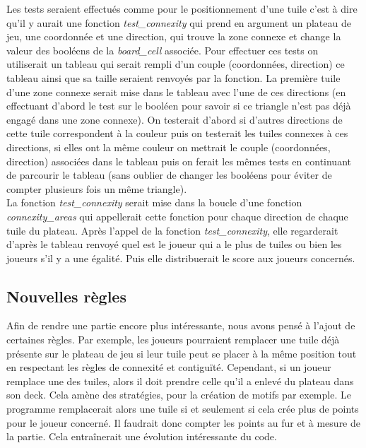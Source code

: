 \documentclass[11pt]{article}
\begin{document}
Les tests seraient effectués comme pour le positionnement d'une tuile c'est à dire qu'il y aurait une fonction \emph{test\_connexity} qui prend en argument un plateau de jeu, une coordonnée et une direction, qui trouve la zone connexe et change la valeur des booléens de la \emph{board\_cell} associée. Pour effectuer ces tests on utiliserait un tableau qui serait rempli d'un couple (coordonnées, direction) ce tableau ainsi que sa taille seraient renvoyés par la fonction. La première tuile d'une zone connexe serait mise dans le tableau avec l'une de ces directions (en effectuant d'abord le test sur le booléen pour savoir si ce triangle n'est pas déjà engagé dans une zone connexe). On testerait d'abord si d'autres directions de cette tuile correspondent à la couleur puis on testerait les tuiles connexes à ces directions, si elles ont la même couleur on mettrait le couple (coordonnées, direction) associées dans le tableau puis on ferait les mêmes tests en continuant de parcourir le tableau (sans oublier de changer les booléens pour éviter de compter plusieurs fois un même triangle). \\

La fonction \emph{test\_connexity} serait mise dans la boucle d'une fonction \emph{connexity\_areas} qui appellerait cette fonction pour chaque direction de chaque tuile du plateau. Après l'appel de la fonction \emph{test\_connexity}, elle regarderait d'après le tableau renvoyé quel est le joueur qui a le plus de tuiles ou bien les joueurs s'il y a une égalité. Puis elle distribuerait le score aux joueurs concernés. 

\subsection{Nouvelles règles}
Afin de rendre une partie encore plus intéressante, nous avons pensé à l'ajout de certaines règles. Par exemple, les joueurs pourraient remplacer une tuile déjà présente sur le plateau de jeu si leur tuile peut se placer à la même position tout en respectant les règles de connexité et contiguïté. Cependant, si un joueur remplace une des tuiles, alors il doit prendre celle qu'il a enlevé du plateau dans son deck. Cela amène des stratégies, pour la création de motifs par exemple. Le programme remplacerait alors une tuile si et seulement si cela crée plus de points pour le joueur concerné. Il faudrait donc compter les points au fur et à mesure de la partie. Cela entraînerait une évolution intéressante du code. \\
\end{document}
